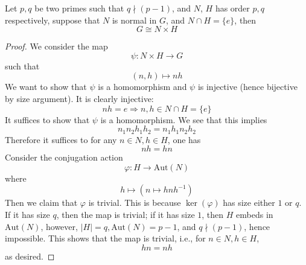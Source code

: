 \begin{lem}
    Let $p,q$ be two primes such that $q\nmid (p-1)$, and $N$, $H$ has order $p,q$ respectively, suppose that $N$ is normal in $G$, and $N\cap H=\{e\}$, then 
    \begin{equation*}
        G\cong N\times H
    \end{equation*}
\end{lem}
\begin{proof}
    We consider the map 
    \begin{equation*}
        \psi: N\times H\to G
    \end{equation*}
    such that 
    \begin{equation*}
        (n,h)\mapsto nh
    \end{equation*}
    We want to show that $\psi$ is a homomorphism and $\psi$ is injective (hence bijective by size argument). It is clearly injective: 
    \begin{equation*}
        nh=e\Rightarrow n, h\in N\cap H=\{e\}
    \end{equation*}
    It suffices to show that $\psi$ is a homomorphism. We see that this implies 
    \begin{equation*}
        n_1n_2h_1h_2=n_1h_1n_2h_2
    \end{equation*}
    Therefore it suffices to for any $n\in N, h\in H$, one has
    \begin{equation*}
        nh=hn
    \end{equation*}
    Consider the conjugation action 
    \begin{equation*}
        \varphi: H\to \text{Aut}(N)
    \end{equation*}
    where 
    \begin{equation*}
        h\mapsto \left( n\mapsto hnh^{-1}\right)
    \end{equation*}
    Then we claim that $\varphi$ is trivial. This is because $\ker(\varphi)$ has size either $1$ or $q$. If it has size $q$, then the map is trivial; if it has size $1$, then $H$ embeds in $\text{Aut}(N)$, however, $|H|=q, \text{Aut}(N)=p-1$, and $q\nmid(p-1)$, hence impossible. This shows that the map is trivial, i.e., for $n\in N, h\in H$, 
    \begin{equation*}
        hn=nh
    \end{equation*}
    as desired. 
\end{proof}


